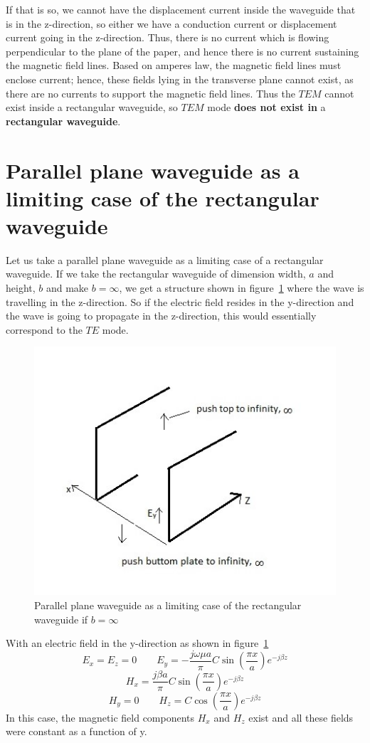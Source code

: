 If that is so, we cannot have the displacement current inside the waveguide that is in the z-direction, so either we have a conduction current or displacement current going in the z-direction. Thus, there is no current which is flowing perpendicular to the plane of the paper, and hence there is no current sustaining the magnetic field lines. Based on amperes law, the magnetic field lines must enclose current; hence, these fields lying in the transverse plane cannot exist, as there are no currents to support the magnetic field lines. Thus the $TEM$ cannot exist inside a rectangular waveguide, so $TEM$ mode \textbf{does not exist in} a \textbf{rectangular waveguide}.

\section{Parallel plane waveguide as a limiting case of the rectangular waveguide}
Let us take a parallel plane waveguide as a limiting case of a rectangular waveguide. If we take the rectangular waveguide of dimension width, $a$ and height, $b$ and make ${b=\infty}$, we get a structure shown in figure~\ref{fig:page3} where the wave is travelling in the z-direction. So if the electric field resides in the y-direction and the wave is going to propagate in the z-direction, this would essentially correspond to the $TE$ mode. 
\begin{figure}[h]
\centering
\includegraphics[width=.7\linewidth]{./graphics/page3}
\caption{Parallel plane waveguide as a limiting case of the rectangular waveguide if $b=\infty$}
\label{fig:page3}
\end{figure}

With an electric field in the y-direction as shown in figure~\ref{fig:page3}
\begin{dmath*}
{E_x = E_z = 0 \qquad E_y = - \frac{j\omega\mu a}{\pi} C\sin(\frac{\pi x}{a})e^{-j\beta z}}
\end{dmath*}
\begin{dmath*}
H_x =  \frac{j\beta a}{\pi} C\sin(\dfrac{\pi x}{a})e^{-j\beta z}
\end{dmath*}
\begin{dmath*}
H_y = 0\qquad H_z = C\cos(\dfrac{\pi x}{a})e^{-j\beta z} 
\end{dmath*}
In this case, the magnetic field components ${H_x}$ and ${H_z}$ exist and all these fields were constant as a function of y. 

